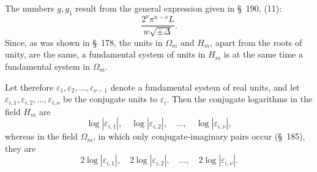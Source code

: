 \documentclass[11pt]{article}
\providecommand{\eps}{\varepsilon}
\providecommand{\eps}{\varepsilon}
\begin{document}
The numbers $g,g_1$ result from the general expression given in \S~190, (11):
\begin{equation}
\frac{2^\nu\pi^{n-\nu}L}{w\sqrt{\pm\Delta}}.
\tag{11}
\end{equation}
Since, as was shown in \S~178, the units in $\Omega_m$ and $H_m$, apart from the roots of unity, are the same, a fundamental system of units in $H_m$ is at the same time a fundamental system in $\Omega_m$.

Let therefore $\eps_1,\eps_2,\ldots,\eps_{\nu-1}$ denote a fundamental system of real units, and let $\eps_{i,1},\eps_{i,2},\ldots,\eps_{i,\nu}$ be the conjugate units to $\eps_i$. Then the conjugate logarithms in the field $H_m$ are
\[
\log|\eps_{i,1}|,\quad \log|\eps_{i,2}|,\quad\ldots,\quad \log|\eps_{i,\nu}|,
\]
whereas in the field $\Omega_m$, in which only conjugate-imaginary pairs occur (\S~185), they are
\[
2\log|\eps_{i,1}|,\quad 2\log|\eps_{i,2}|,\quad\ldots,\quad2\log|\eps_{i,\nu}|.
\]
\end{document}
